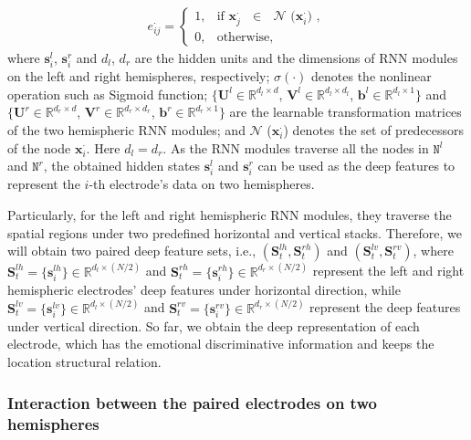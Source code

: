 \documentclass[journal]{IEEEtran}
\begin{document}
\vspace{-0.25cm}
\begin{align}
e^{\cdot}_{ij} = \left\{
\begin{array}{lr}
1, & \textrm{if $\mathbf{x}^{\cdot}_j$ $\in$ $\mathcal{N}$ ($\mathbf{x}^{\cdot}_i$) },\\
0, & \textrm{otherwise},~~~~~~~~~
\end{array}
\right.
\end{align}	
where $\mathbf{s}^l_i$, $\mathbf{s}^r_i$ and $d_l$, $d_r$ are the hidden units and the dimensions of RNN modules on the left and right hemispheres, respectively; $\sigma(\cdot)$ denotes the nonlinear operation such as Sigmoid function; $\{\mathbf{U}^l \!\!\in\!\! \mathbb{R}^{d_l \times d}$, $\mathbf{V}^l \!\!\in\!\! \mathbb{R}^{d_l \times d_l}$, $\mathbf{b}^l \!\!\in\!\! \mathbb{R}^{d_l \times 1}\}$ and $\{\mathbf{U}^r \!\!\in\!\! \mathbb{R}^{d_r \times d}$, $\mathbf{V}^r \!\!\in\!\! \mathbb{R}^{d_r \times d_r}$, $\mathbf{b}^r \!\!\in\!\! \mathbb{R}^{d_r \times 1}\}$ are the learnable transformation matrices of the two hemispheric RNN modules; and $\mathcal{N}$ ($\mathbf{x}^{\cdot}_i$) denotes the set of predecessors of the node $\mathbf{x}^{\cdot}_i$. Here $d_l \!=\! d_r$. As the RNN modules traverse all the nodes in $\texttt{N}^l$ and $\texttt{N}^r$, the obtained hidden states $\mathbf{s}^l_i$ and $\mathbf{s}^r_i$ can be used as the deep features to represent the $i$-th electrode's data on two hemispheres.

Particularly, for the left and right hemispheric RNN modules, they traverse the spatial regions under two predefined horizontal and vertical stacks. Therefore, we will obtain two paired deep feature sets, i.e.,	$(\mathbf{S}_t^{lh}, \mathbf{S}_t^{rh})$ and $(\mathbf{S}_t^{lv}, \mathbf{S}_t^{rv})$, where $\mathbf{S}_t^{lh} \!=\! \{\mathbf{s}^{lh}_i\}\!\in\! \mathbb{R}^{d_l \times (N/2)}$ and $\mathbf{S}_t^{rh} \!=\! \{\mathbf{s}^{rh}_i\} \!\in\! \mathbb{R}^{d_r \times (N/2)}$ represent the left and right hemispheric electrodes' deep features under horizontal direction, while $\mathbf{S}_t^{lv} \!= \!\{\mathbf{s}^{lv}_i\} \!\in\! \mathbb{R}^{d_l \times (N/2)}$ and $\mathbf{S}_t^{rv} \!=\! \{\mathbf{s}^{rv}_i\} \!\in\! \mathbb{R}^{d_r \times (N/2)}$ represent the deep features under vertical direction. So far, we obtain the deep representation of each electrode, which has the emotional discriminative information and keeps the location structural relation.

\subsubsection{Interaction between the paired electrodes on two hemispheres}
\end{document}
